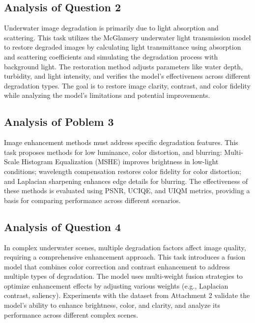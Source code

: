 \documentclass[withoutpreface,bwprint]{cumcmthesis}
\begin{document}
\subsection{Analysis of Question 2}

Underwater image degradation is primarily due to light absorption and scattering. This task utilizes the McGlamery underwater light transmission model to restore degraded images by calculating light transmittance using absorption and scattering coefficients and simulating the degradation process with background light. The restoration method adjusts parameters like water depth, turbidity, and light intensity, and verifies the model’s effectiveness across different degradation types. The goal is to restore image clarity, contrast, and color fidelity while analyzing the model's limitations and potential improvements.

\subsection{Analysis of Poblem 3}

Image enhancement methods must address specific degradation features. This task proposes methods for low luminance, color distortion, and blurring: Multi-Scale Histogram Equalization (MSHE) improves brightness in low-light conditions; wavelength compensation restores color fidelity for color distortion; and Laplacian sharpening enhances edge details for blurring. The effectiveness of these methods is evaluated using PSNR, UCIQE, and UIQM metrics, providing a basis for comparing performance across different scenarios.

\subsection{Analysis of Question 4}

In complex underwater scenes, multiple degradation factors affect image quality, requiring a comprehensive enhancement approach. This task introduces a fusion model that combines color correction and contrast enhancement to address multiple types of degradation. The model uses multi-weight fusion strategies to optimize enhancement effects by adjusting various weights (e.g., Laplacian contrast, saliency). Experiments with the dataset from Attachment 2 validate the model's ability to enhance brightness, color, and clarity, and analyze its performance across different complex scenes.

\newpage
\end{document}

